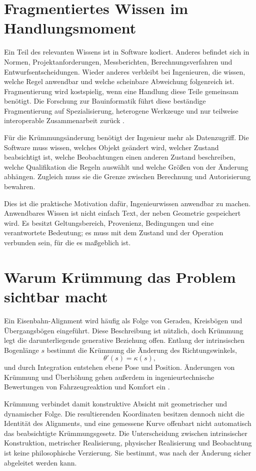 \section{Fragmentiertes Wissen im Handlungsmoment}

Ein Teil des relevanten Wissens ist in Software kodiert. Anderes befindet sich
in Normen, Projektanforderungen, Messberichten, Berechnungsverfahren und
Entwurfsentscheidungen. Wieder anderes verbleibt bei Ingenieuren, die wissen,
welche Regel anwendbar und welche scheinbare Abweichung folgenreich ist.
Fragmentierung wird kostspielig, wenn eine Handlung diese Teile gemeinsam
benötigt. Die Forschung zur Bauinformatik führt diese beständige
Fragmentierung auf Spezialisierung, heterogene Werkzeuge und nur teilweise
interoperable Zusammenarbeit zurück \cite{Turk2020Interoperability}.

Für die Krümmungsänderung benötigt der Ingenieur mehr als Datenzugriff. Die
Software muss wissen, welches Objekt geändert wird, welcher Zustand
beabsichtigt ist, welche Beobachtungen einen anderen Zustand beschreiben,
welche Qualifikation die Regeln auswählt und welche Größen von der Änderung
abhängen. Zugleich muss sie die Grenze zwischen Berechnung und Autorisierung
bewahren.

Dies ist die praktische Motivation dafür, Ingenieurwissen anwendbar zu machen.
Anwendbares Wissen ist nicht einfach Text, der neben Geometrie gespeichert
wird. Es besitzt Geltungsbereich, Provenienz, Bedingungen und eine
verantwortete Bedeutung; es muss mit dem Zustand und der Operation verbunden
sein, für die es maßgeblich ist.

\section{Warum Krümmung das Problem sichtbar macht}

Ein Eisenbahn-Alignment wird häufig als Folge von Geraden, Kreisbögen und
Übergangsbögen eingeführt. Diese Beschreibung ist nützlich, doch Krümmung legt
die darunterliegende generative Beziehung offen. Entlang der intrinsischen
Bogenlänge \(s\) bestimmt die Krümmung die Änderung des Richtungswinkels,
\[
  \theta'(s)=\kappa(s),
\]
und durch Integration entstehen ebene Pose und Position. Änderungen von
Krümmung und Überhöhung gehen außerdem in ingenieurtechnische Bewertungen von
Fahrzeugreaktion und Komfort ein
\cite{Kufver2000RailwayAlignment,BrustadDalmo2020Review}.

Krümmung verbindet damit konstruktive Absicht mit geometrischer und dynamischer
Folge. Die resultierenden Koordinaten besitzen dennoch nicht die Identität des
Alignments, und eine gemessene Kurve offenbart nicht automatisch das
beabsichtigte Krümmungsgesetz. Die Unterscheidung zwischen intrinsischer
Konstruktion, metrischer Realisierung, physischer Realisierung und Beobachtung
ist keine philosophische Verzierung. Sie bestimmt, was nach der Änderung
sicher abgeleitet werden kann.

